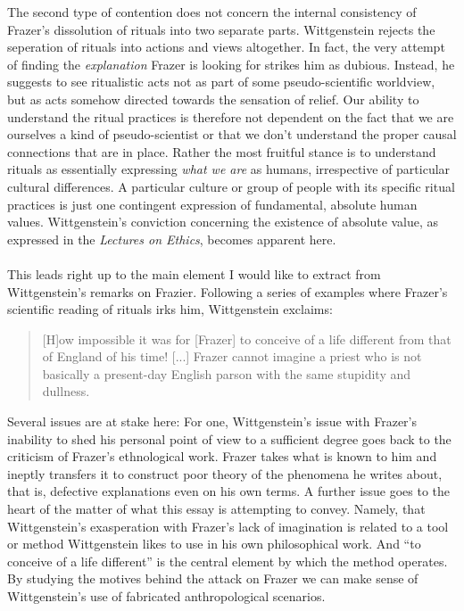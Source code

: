 \documentclass{article}
\begin{document}
The second type of contention does not concern the internal consistency of Frazer's dissolution of rituals into two separate parts. Wittgenstein rejects the seperation of rituals into actions and views altogether.
In fact, the very attempt of finding the \textit{explanation} Frazer is looking for strikes him as dubious.
Instead, he suggests to see ritualistic acts not as part of some pseudo-scientific worldview, but as acts somehow directed towards the sensation of relief. Our ability to understand the ritual practices is therefore not dependent on the fact that we are ourselves a kind of pseudo-scientist or that we don't understand the proper causal connections that are in place. Rather the most fruitful stance is to understand rituals as essentially expressing \textit{what we are} as humans, irrespective of particular cultural differences. A particular culture or group of people with its specific ritual practices is just one contingent expression of fundamental, absolute human values. Wittgenstein's conviction concerning the existence of absolute value, as expressed in the \textit{Lectures on Ethics}, becomes apparent here.

\paragraph{ }
This leads right up to the main element I would like to extract from Wittgenstein's remarks on Frazier. Following a series of examples where Frazer's scientific reading of rituals irks him, Wittgenstein exclaims:
\begin{quote}
[H]ow impossible it was for [Frazer] to conceive of a life different from that of England of his time! [...] Frazer cannot imagine a priest who is not basically a present-day English parson with the same stupidity and dullness. %
\end{quote} %
Several issues are at stake here: For one, Wittgenstein's issue with Frazer's inability to shed his personal point of view to a sufficient degree goes back to the criticism of Frazer's ethnological work. Frazer takes what is known to him and ineptly transfers it to construct poor theory of the phenomena he writes about, that is, defective explanations even on his own terms. A further issue goes to the heart of the matter of what this essay is attempting to convey. Namely, that Wittgenstein's exasperation with Frazer's lack of imagination is related to a tool or method Wittgenstein likes to use in his own philosophical work. And ``to conceive of a life different'' is the central element by which the method operates. By studying the motives behind the attack on Frazer we can make sense of Wittgenstein's use of fabricated anthropological scenarios. 
 
\end{document}
